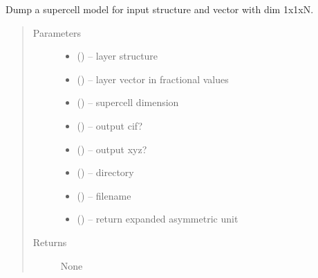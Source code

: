 \documentclass[letterpaper,10pt,english]{sphinxmanual}
\begin{document}
\begin{fulllineitems}
\label{\detokenize{rst/supercell:mstack.supercell.supercell}}
Dump a supercell model for input structure and vector with dim 1x1xN.
\begin{quote}\begin{description}
\item[{Parameters}] \leavevmode\begin{itemize}
\item {} 
 ({\hyperref[\detokenize{rst/structure:mstack.structure.Structure}]{}}) -- layer structure

\item {} 
 (\sphinxstyleliteralemphasis{, }) -- layer vector in fractional values

\item {} 
 () -- supercell dimension

\item {} 
 () -- output cif?

\item {} 
 () -- output xyz?

\item {} 
 () -- directory

\item {} 
 () -- filename

\item {} 
 () -- return expanded asymmetric unit

\end{itemize}

\item[{Returns}] \leavevmode
None

\end{description}\end{quote}

\end{fulllineitems}
\end{document}
